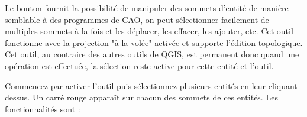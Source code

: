 \begin{itemize}


Le bouton  fournit la possibilité de manipuler des sommets d'entité de manière semblable à des programmes de CAO, on peut sélectionner facilement de multiples sommets à la fois et les déplacer, les effacer, les ajouter, etc. Cet outil fonctionne avec la projection "à la volée" activée et supporte l'édition topologique. Cet outil, au contraire des autres outils de QGIS, est permanent donc quand une opération est effectuée, la sélection reste active pour cette entité et l'outil.


Commencez par activer l'outil  puis sélectionnez plusieurs entités en leur cliquant dessus. Un carré rouge apparaît sur chacun des sommets de ces entités. Les fonctionnalités sont :


\end{itemize}
